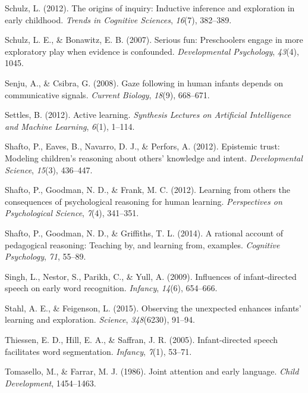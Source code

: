 \documentclass[a4paper,man,apacite,floatsintext]{apa6}
\begin{document}
\hypertarget{ref-schulz2012origins}{}
Schulz, L. (2012). The origins of inquiry: Inductive inference and
exploration in early childhood. \emph{Trends in Cognitive Sciences},
\emph{16}(7), 382--389.

\hypertarget{ref-schulz2007serious}{}
Schulz, L. E., \& Bonawitz, E. B. (2007). Serious fun: Preschoolers
engage in more exploratory play when evidence is confounded.
\emph{Developmental Psychology}, \emph{43}(4), 1045.

\hypertarget{ref-senju2008gaze}{}
Senju, A., \& Csibra, G. (2008). Gaze following in human infants depends
on communicative signals. \emph{Current Biology}, \emph{18}(9),
668--671.

\hypertarget{ref-settles2012active}{}
Settles, B. (2012). Active learning. \emph{Synthesis Lectures on
Artificial Intelligence and Machine Learning}, \emph{6}(1), 1--114.

\hypertarget{ref-shafto2012epistemic}{}
Shafto, P., Eaves, B., Navarro, D. J., \& Perfors, A. (2012). Epistemic
trust: Modeling children's reasoning about others' knowledge and intent.
\emph{Developmental Science}, \emph{15}(3), 436--447.

\hypertarget{ref-shafto2012learning}{}
Shafto, P., Goodman, N. D., \& Frank, M. C. (2012). Learning from others
the consequences of psychological reasoning for human learning.
\emph{Perspectives on Psychological Science}, \emph{7}(4), 341--351.

\hypertarget{ref-shafto2014rational}{}
Shafto, P., Goodman, N. D., \& Griffiths, T. L. (2014). A rational
account of pedagogical reasoning: Teaching by, and learning from,
examples. \emph{Cognitive Psychology}, \emph{71}, 55--89.

\hypertarget{ref-singh2009influences}{}
Singh, L., Nestor, S., Parikh, C., \& Yull, A. (2009). Influences of
infant-directed speech on early word recognition. \emph{Infancy},
\emph{14}(6), 654--666.

\hypertarget{ref-stahl2015observing}{}
Stahl, A. E., \& Feigenson, L. (2015). Observing the unexpected enhances
infants' learning and exploration. \emph{Science}, \emph{348}(6230),
91--94.

\hypertarget{ref-thiessen2005infant}{}
Thiessen, E. D., Hill, E. A., \& Saffran, J. R. (2005). Infant-directed
speech facilitates word segmentation. \emph{Infancy}, \emph{7}(1),
53--71.

\hypertarget{ref-tomasello1986joint}{}
Tomasello, M., \& Farrar, M. J. (1986). Joint attention and early
language. \emph{Child Development}, 1454--1463.
\end{document}

